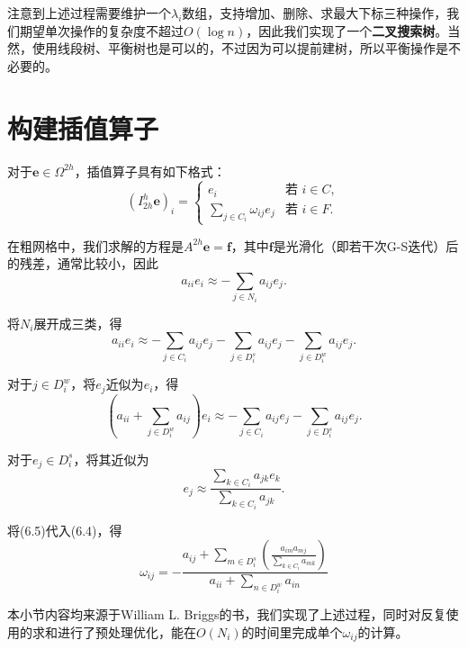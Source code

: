 \documentclass[lang=cn,10pt,bibend=bibtex]{elegantbook}
\begin{document}
注意到上述过程需要维护一个$\lambda_i$数组，支持增加、删除、求最大下标三种操作，我们期望单次操作的复杂度不超过$O(\log n)$，因此我们实现了一个\textbf{二叉搜索树}。当然，使用线段树、平衡树也是可以的，不过因为可以提前建树，所以平衡操作是不必要的。

\section{构建插值算子}

对于$\mathbf{e}\in\Omega^{2h}$，插值算子具有如下格式：
\begin{equation}
  (I_{2h}^h \mathbf{e})_i=\left\{
    \begin{array}{ll}
      e_i & \text{若 }i\in C,\\
      \sum_{j\in C_i}\omega_{ij}e_j & \text{若 }i\in F.
    \end{array}
  \right.
\end{equation}

在粗网格中，我们求解的方程是$A^{2h}\mathbf{e}=\mathbf{f}$，其中$\mathbf{f}$是光滑化（即若干次G-S迭代）后的残差，通常比较小，因此
\begin{equation*}
  a_{ii}e_i\approx -\sum_{j\in N_i} a_{ij}e_j.
\end{equation*}

将$N_i$展开成三类，得
\begin{equation}
  a_{ii}e_i\approx -\sum_{j\in C_i} a_{ij}e_j -\sum_{j\in D^s_i} a_{ij}e_j -\sum_{j\in D^w_i} a_{ij}e_j.
\end{equation}

对于$j\in D^w_i$，将$e_j$近似为$e_i$，得
\begin{equation}
  \left(a_{ii}+\sum_{j\in D^w_i} a_{ij}\right)e_i\approx -\sum_{j\in C_i} a_{ij}e_j -\sum_{j\in D^s_i} a_{ij}e_j.
\end{equation}

对于$e_j\in D_i^s$，将其近似为
\begin{equation}
  e_j\approx \frac{\sum_{k\in C_i} a_{jk}e_k}{\sum_{k\in C_i} a_{jk}}.
\end{equation}

将(6.5)代入(6.4)，得
\begin{equation}
  \omega_{ij}=-\frac{a_{ij}+\sum\limits_{m\in D_i^s}\left(\frac{a_{im}a_{mj}}{\sum\limits_{k\in C_i} a_{mk}}\right)}{a_{ii}+\sum\limits_{n\in D_i^w} a_{in}}
\end{equation}

本小节内容均来源于William L. Briggs的书，我们实现了上述过程，同时对反复使用的求和进行了预处理优化，能在$O(N_i)$的时间里完成单个$\omega_{ij}$的计算。
\end{document}
